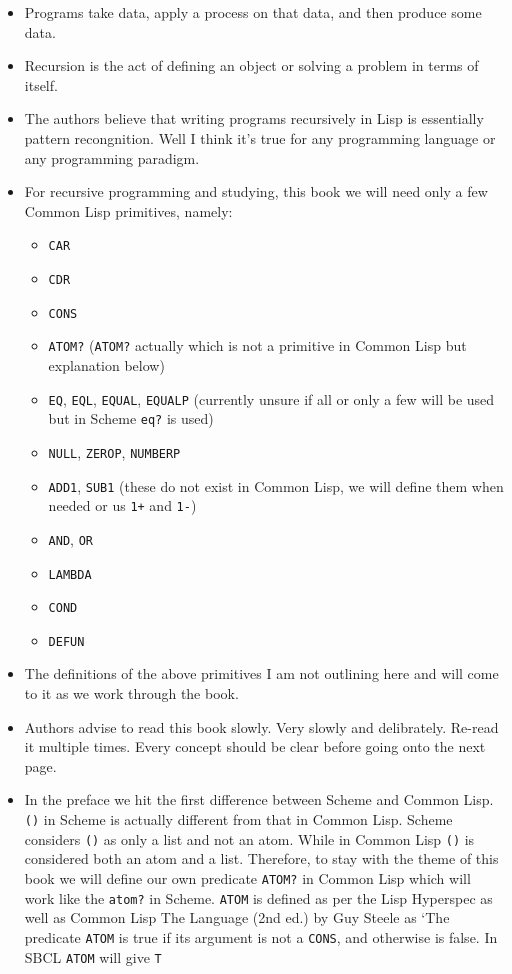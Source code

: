 \documentclass[11pt]{article}
\begin{document}
\vspace{1em}

\begin{itemize}
\item Programs take data, apply a process on that data, and then produce some data.
\item Recursion is the act of defining an object or solving a problem in terms of itself.
\item The authors believe that writing programs recursively in Lisp is essentially pattern recongnition. Well I think
it's true for any programming language or any programming paradigm.
\item For recursive programming and studying, this book we will need only a few Common Lisp primitives, namely:
\begin{itemize}
\item \texttt{CAR}
\item \texttt{CDR}
\item \texttt{CONS}
\item \texttt{ATOM?} (\texttt{ATOM?} actually which is not a primitive in Common Lisp but explanation below)
\item \texttt{EQ}, \texttt{EQL}, \texttt{EQUAL}, \texttt{EQUALP} (currently unsure if all or only a few will be used but in Scheme \texttt{eq?} is used)
\item \texttt{NULL}, \texttt{ZEROP}, \texttt{NUMBERP}
\item \texttt{ADD1}, \texttt{SUB1} (these do not exist in Common Lisp, we will define them when needed or us \texttt{1+} and \texttt{1-})
\item \texttt{AND}, \texttt{OR}
\item \texttt{LAMBDA}
\item \texttt{COND}
\item \texttt{DEFUN}
\end{itemize}
\item The definitions of the above primitives I am not outlining here and will come to it as we work through the book.
\item Authors advise to read this book slowly. Very slowly and delibrately. Re-read it multiple times. Every concept
should be clear before going onto the next page.
\item In the preface we hit the first difference between Scheme and Common Lisp. \texttt{()} in Scheme is actually different
from that in Common Lisp. Scheme considers \texttt{()} as only a list and not an atom. While in Common Lisp \texttt{()} is
considered both an atom and a list. Therefore, to stay with the theme of this book we will define our own
predicate \texttt{ATOM?} in Common Lisp which will work like the \texttt{atom?} in Scheme. \texttt{ATOM} is defined as per the Lisp
Hyperspec as well as Common Lisp The Language (2nd ed.) by Guy Steele as `The predicate \texttt{ATOM} is true if its
argument is not a \texttt{CONS}, and otherwise is false. In SBCL \texttt{ATOM} will give \texttt{T}


\end{itemize}
\end{document}
